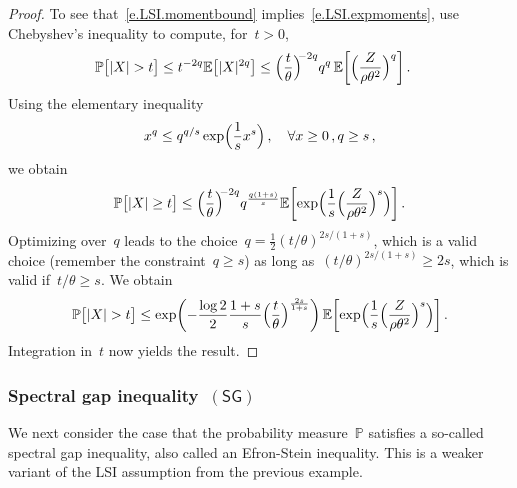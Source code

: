 \documentclass[11pt,twoside]{article} %
\numberwithin{equation}{section}
\theoremstyle{definition}
\let\originalleft\left
\let\originalright\right
\renewcommand{\left}{\mathopen{}\mathclose\bgroup\originalleft}
\renewcommand{\right}{\aftergroup\egroup\originalright}
\renewcommand{\P}{\mathbb{P}}
\newcommand{\E}{\mathbb{E}}
\begin{document}
\begin{proof}
To see that~\eqref{e.LSI.momentbound} implies~\eqref{e.LSI.expmoments}, use Chebyshev's inequality to compute, for~$t>0$, 
\begin{align*}
\P \bigl[ |X| > t \bigr]
\leq
t^{-2q} \E \bigl[ |X|^{2q} \bigr]
&
\leq
\Bigl( \frac{t}{\theta} \Bigr)^{\!\!-2q} 
q^{q} \,
\E \biggl[ \Bigl( \frac{Z}{\rho\theta^2} \Bigr)^{q} \biggr]\,.
\end{align*}
Using the elementary inequality 
\begin{equation*}
x^q \leq q^{q/s} \exp\Bigl( \frac1s x^s \Bigr)\,, \quad \forall x \geq0\,, q \geq s\,,
\end{equation*}
we obtain
\begin{equation*}
\P \bigl[ |X| \geq t \bigr]
\leq
\Bigl( \frac{t}{\theta} \Bigr)^{\!\!-2q} 
q^{\frac{q(1+s)}{s}}
\E \left[ \exp\Bigl( \frac1{s} \Bigl( \frac{Z}{\rho\theta^2}  \Bigr)^{s} \Bigr) \right] 
\,.
\end{equation*}
Optimizing over~$q$ leads to the choice~$q = \frac12 (t / \theta)^{2s/(1+s)}$, which is a valid choice (remember the constraint~$q\geq s$) as long as~$(t / \theta)^{2s/(1+s)} \geq 2s$, which is valid if~$t / \theta \geq s$. We obtain
\begin{equation*}
\P \bigl[ |X| > t \bigr]
\leq
\exp\biggl( 
-\frac{\log 2}{2}
\frac{1+s}{s} \Bigl( \frac{t}{\theta} \Bigr)^{\frac{2s}{1+s}}
\biggr) \,
\E \left[ \exp\Bigl( \frac1{s} \Bigl( \frac{Z}{\rho\theta^2}  \Bigr)^{s} \Bigr) \right]
\,.
\end{equation*}
Integration in~$t$ now yields the result. 
\end{proof}




\subsubsection{Spectral gap inequality~$(\mathsf{SG})$}
\label{ss.SG}

We next consider the case that the probability measure~$\P$ satisfies a so-called spectral gap inequality, also called an Efron-Stein inequality. This is a weaker variant of the LSI assumption from the previous example. 

\smallskip
\end{document}
